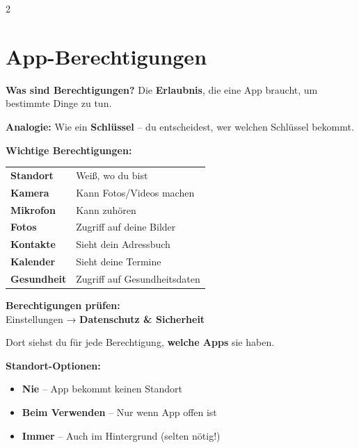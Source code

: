 \documentclass[a4paper,landscape,8pt]{extarticle}
\begin{document}
\begin{multicols}{2}

\section*{\textcolor{permissionorange}{App-Berechtigungen}}

\textbf{Was sind Berechtigungen?} Die \textbf{Erlaubnis}, die eine App braucht, um bestimmte Dinge zu tun.

\textbf{Analogie:} Wie ein \textbf{Schlüssel} -- du entscheidest, wer welchen Schlüssel bekommt.

\vspace{2mm}

\textbf{Wichtige Berechtigungen:}

\renewcommand{\arraystretch}{1.3}
\begin{tabular}{@{}p{2.2cm}p{5.3cm}@{}}
\textbf{Standort} & Weiß, wo du bist \\
\textbf{Kamera} & Kann Fotos/Videos machen \\
\textbf{Mikrofon} & Kann zuhören \\
\textbf{Fotos} & Zugriff auf deine Bilder \\
\textbf{Kontakte} & Sieht dein Adressbuch \\
\textbf{Kalender} & Sieht deine Termine \\
\textbf{Gesundheit} & Zugriff auf Gesundheitsdaten \\
\end{tabular}
\renewcommand{\arraystretch}{1}

\vspace{2mm}

\textbf{Berechtigungen prüfen:}\\
Einstellungen → \textbf{Datenschutz \& Sicherheit}

Dort siehst du für jede Berechtigung, \textbf{welche Apps} sie haben.

\vspace{2mm}

\textbf{Standort-Optionen:}
\begin{itemize}
\item \textbf{Nie} -- App bekommt keinen Standort
\item \textbf{Beim Verwenden} -- Nur wenn App offen ist
\item \textbf{Immer} -- Auch im Hintergrund (selten nötig!)
\end{itemize}

\vspace{2mm}


\end{multicols}
\end{document}
